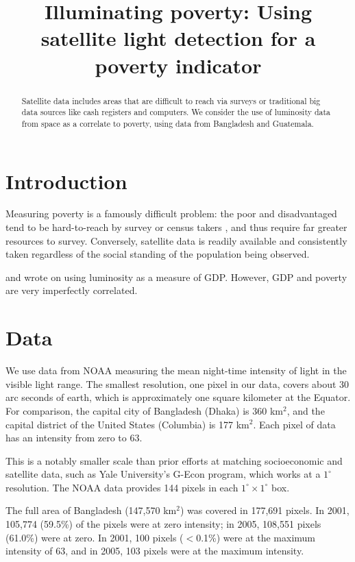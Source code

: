 \documentclass{article}
\begin{document}
\title{Illuminating poverty: Using satellite light detection for a poverty indicator}
\maketitle
\begin{abstract}
Satellite data includes areas that are difficult to reach via surveys or traditional big
data sources like cash registers and computers. We consider the use of luminosity data
from space as a correlate to poverty, using data from Bangladesh and Guatemala.
\end{abstract}

\section{Introduction}

Measuring poverty is a famously difficult problem: the poor and disadvantaged tend to be
hard-to-reach by survey or census takers \citep{h2r:asa}, and thus require far greater resources to
survey. Conversely, satellite data is readily available and consistently taken
regardless of the social standing of the population being observed. 



\citet{chen:pnas} and \citet{henderson:nber} wrote on using luminosity as a measure of GDP.
However, GDP and poverty are very imperfectly correlated.

\section{Data} We use data from NOAA measuring the mean night-time intensity of light in
the visible light range. The smallest resolution, one pixel in our data, covers about
30 arc seconds of earth, which is approximately one square kilometer at the Equator. For comparison,
the capital city of Bangladesh (Dhaka) is 360 km$^2$, and the capital district of the
United States (Columbia) is 177 km$^2$. Each pixel of data has an intensity from zero
to 63.

This is a notably smaller scale than prior efforts at matching socioeconomic and satellite
data, such as Yale University's G-Econ program, which works at a $1^\circ$ resolution.
The NOAA data provides 144 pixels in each $1^\circ \times 1^\circ$ box.

The full area of Bangladesh (147,570 km$^2$) was covered in 177,691 pixels. In 2001,
105,774 (59.5\%) of the pixels were at zero intensity; in 2005, 108,551 pixels (61.0\%)
were at zero. In 2001, 100 pixels ($<$0.1\%) were at the maximum intensity of 63, and in
2005, 103 pixels were at the maximum intensity.
\end{document}
